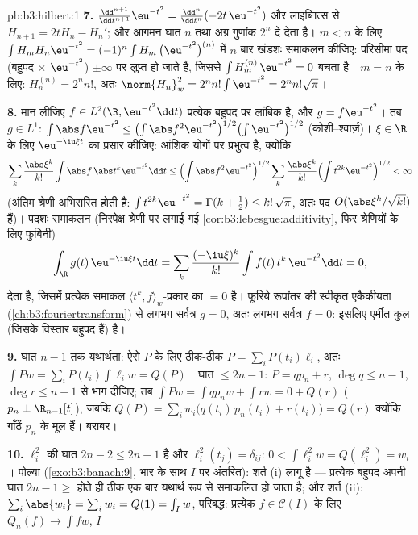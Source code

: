 \begin{solution}{pb:b3:hilbert:1}
\textbf{7.} $\frac{\dd^{n+1}}{\dd t^{n+1}}\eu^{-t^2} =
\frac{\dd^n}{\dd t^n}(-2t\,\eu^{-t^2})$ और लाइब्नित्स से $H_{n+1}
= 2tH_n - H_n'$; और आगमन घात $n$ तथा अग्र
गुणांक $2^n$ दे देता है। $m < n$ के लिए $\int H_m H_n\eu^{-t^2} = (-1)^n\int H_m\,\bigl(\eu^{-t^2}
\bigr)^{(n)}$ में $n$ बार खंडशः
समाकलन कीजिए: परिसीमा पद (बहुपद $\times$ $\eu^{-t^2}$) $\pm\infty$ पर लुप्त हो जाते
हैं, जिससे $\int
H_m^{(n)}\,\eu^{-t^2} = 0$ बचता है। $m = n$ के लिए: $H_n^{(n)} = 2^nn!$, अतः $\norm{H_n}_w^2 = 2^nn!\int\eu^{-t^2} = 2^nn!\sqrt\pi$।

\textbf{8.} मान लीजिए $f \in L^2(\R, \eu^{-t^2}\dd t)$ प्रत्येक बहुपद पर लांबिक है, और $g = f\eu^{-t^2}$।
तब $g \in
L^1$: $\int\abs f\eu^{-t^2} \leq \bigl(\int\abs
f^2\eu^{-t^2}\bigr)^{1/2}\bigl(\int\eu^{-t^2}\bigr)^{1/2}$ (कोशी--श्वार्ज़)। $\xi \in \R$ के लिए $\eu^{-\iu\xi t}$ का प्रसार कीजिए:
आंशिक योगों पर प्रभुत्व है, क्योंकि
\[
\sum_k\frac{\abs\xi^k}{k!}\int\abs f\,\abs t^k\eu^{-t^2}\dd t
\leq \Bigl(\int \abs f^2\eu^{-t^2}\Bigr)^{1/2}
\sum_k\frac{\abs\xi^k}{k!}\Bigl(\int
t^{2k}\eu^{-t^2}\Bigr)^{1/2} < \infty
\]
(अंतिम श्रेणी अभिसरित होती है: $\int t^{2k}\eu^{-t^2} =
\Gamma(k+\frac12) \leq k!\,\sqrt\pi$, अतः पद $O(\abs\xi^k/\sqrt{k!})$ हैं)। पदशः समाकलन
(निरपेक्ष श्रेणी पर लगाई गई \cref{cor:b3:lebesgue:additivity}, फिर श्रेणियों के लिए फुबिनी)
\[
\int_\R g(t)\,\eu^{-\iu\xi t}\dd t
= \sum_k\frac{(-\iu\xi)^k}{k!}\int f(t)\,t^k\,\eu^{-t^2}\dd t
= 0 ,
\]
देता है, जिसमें प्रत्येक समाकल $\langle t^k, f\rangle_w$-प्रकार का $= 0$ है। फूरिये
रूपांतर की स्वीकृत एकैकीयता (\cref{ch:b3:fouriertransform}) से लगभग सर्वत्र $g = 0$, अतः लगभग
सर्वत्र $f = 0$: इसलिए एर्मीत कुल (जिसके विस्तार बहुपद हैं)  है।

\textbf{9.} घात $n - 1$ तक यथार्थता: ऐसे $P$ के लिए ठीक-ठीक $P =
\sum_iP(t_i)\ell_i$,
अतः $\int Pw = \sum_iP(t_i)\int
\ell_iw = Q(P)$। घात $\leq 2n - 1$: $P = qp_n + r$, $\deg q \leq n - 1$, $\deg r \leq n-1$ से भाग दीजिए; तब $\int Pw = \int
qp_nw + \int rw = 0 + Q(r)$
($p_n \perp \R_{n-1}[t]$), जबकि
$Q(P) = \sum_iw_i\bigl(q(t_i)\,p_n(t_i) + r(t_i)\bigr) = Q(r)$
क्योंकि गाँठें $p_n$ के मूल हैं। बराबर।

\textbf{10.} $\ell_i^2$ की घात $2n - 2 \leq 2n - 1$ है और $\ell_i^2(t_j) = \delta_{ij}$: $0 < \int\ell_i^2w = Q(\ell_i^2)
= w_i$। पोल्या (\cref{exo:b3:banach:9},
भार के साथ $I$ पर अंतरित): शर्त (i) लागू है --- प्रत्येक बहुपद
अपनी घात $2n - 1 \geq$ होते ही ठीक एक बार यथार्थ रूप से समाकलित हो जाता है;
और शर्त (ii): $\sum_i\abs{w_{i}} = \sum_iw_i = Q(\mathbf 1) = \int_Iw$, परिबद्ध: प्रत्येक $f \in \mathcal C(I)$ के लिए $Q_n(f) \to \int fw$, $I$
।


\end{solution}
